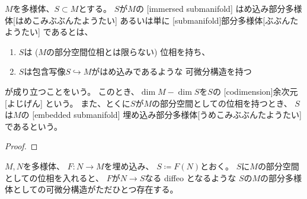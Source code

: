 \documentclass[report]{jlreq}
\begin{document}
\begin{definition}[部分多様体]
    $M$を多様体、$S \subset M$とする。
    $S$が$M$の
    [immersed submanifold]
        {はめ込み部分多様体}[はめこみぶぶんたようたい]
    あるいは単に
    [submanifold]{部分多様体}[ぶぶんたようたい]
    であるとは、
    \begin{enumerate}
        \item $S$は ($M$の部分空間位相とは限らない) 位相を持ち、
        \item $S$は包含写像$S \hookrightarrow M$がはめ込みであるような
            可微分構造を持つ
    \end{enumerate}
    が成り立つことをいう。
    このとき、$\dim M - \dim S$を$S$の
    [codimension]{余次元}[よじげん]
    という。
    また、とくに$S$が$M$の部分空間としての位相を持つとき、
    $S$は$M$の
    [embedded submanifold]
        {埋め込み部分多様体}[うめこみぶぶんたようたい]
    であるという。
\end{definition}

\begin{example}[開部分多様体]
    \TODO{}
\end{example}

\begin{proposition}[はめ込みの像は部分多様体]
\end{proposition}

\begin{proof}
    \TODO{}
\end{proof}

\begin{proposition}[埋め込みの像は部分多様体]
    $M, N$を多様体、
    $F \colon N \to M$を埋め込み、
    $S \coloneqq F(N)$とおく。
    $S$に$M$の部分空間としての位相を入れると、
    $F$が$N \to S$なる diffeo となるような
    $S$の$M$の部分多様体としての可微分構造がただひとつ存在する。
\end{proposition}
\end{document}
